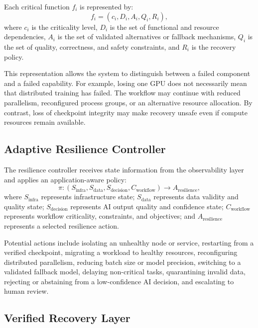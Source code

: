 \documentclass[conference]{IEEEtran}
\begin{document}
Each critical function $f_i$ is represented by:
\begin{equation}
f_i = (c_i, D_i, A_i, Q_i, R_i),
\end{equation}
where $c_i$ is the criticality level, $D_i$ is the set of functional and resource dependencies, $A_i$ is the set of validated alternatives or fallback mechanisms, $Q_i$ is the set of quality, correctness, and safety constraints, and $R_i$ is the recovery policy.

This representation allows the system to distinguish between a failed component and a failed capability. For example, losing one GPU does not necessarily mean that distributed training has failed. The workflow may continue with reduced parallelism, reconfigured process groups, or an alternative resource allocation. By contrast, loss of checkpoint integrity may make recovery unsafe even if compute resources remain available.

\subsection{Adaptive Resilience Controller}

The resilience controller receives state information from the observability layer and applies an application-aware policy:
\begin{equation}
\pi : (S_{\mathrm{infra}}, S_{\mathrm{data}}, S_{\mathrm{decision}}, C_{\mathrm{workflow}}) \rightarrow A_{\mathrm{resilience}},
\end{equation}
where $S_{\mathrm{infra}}$ represents infrastructure state; $S_{\mathrm{data}}$ represents data validity and quality state; $S_{\mathrm{decision}}$ represents AI output quality and confidence state; $C_{\mathrm{workflow}}$ represents workflow criticality, constraints, and objectives; and $A_{\mathrm{resilience}}$ represents a selected resilience action.

Potential actions include isolating an unhealthy node or service, restarting from a verified checkpoint, migrating a workload to healthy resources, reconfiguring distributed parallelism, reducing batch size or model precision, switching to a validated fallback model, delaying non-critical tasks, quarantining invalid data, rejecting or abstaining from a low-confidence AI decision, and escalating to human review.

\subsection{Verified Recovery Layer}
\end{document}
